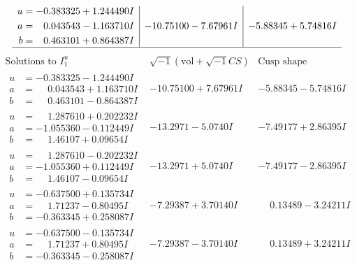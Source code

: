 \documentclass[1p]{elsarticle_modified}
\theoremstyle{definition}
\newcommand{\I}{\sqrt{-1}}
\begin{document}
$$\begin{array}{c|c|c}
\begin{aligned}
u &= -0.383325 + 1.244490 I \\
a &= \phantom{-}0.043543 - 1.163710 I \\
b &= \phantom{-}0.463101 + 0.864387 I\end{aligned}
 & -10.75100 - 7.67961 I & -5.88345 + 5.74816 I\\
 \hline 
 \end{array}$$\newpage$$\begin{array}{c|c|c}  
\text{Solutions to }I^u_{1}& \I (\text{vol} + \sqrt{-1}CS) & \text{Cusp shape}\\
 \hline 
\begin{aligned}
u &= -0.383325 - 1.244490 I \\
a &= \phantom{-}0.043543 + 1.163710 I \\
b &= \phantom{-}0.463101 - 0.864387 I\end{aligned}
 & -10.75100 + 7.67961 I & -5.88345 - 5.74816 I \\ \hline\begin{aligned}
u &= \phantom{-}1.287610 + 0.202232 I \\
a &= -1.055360 - 0.112449 I \\
b &= \phantom{-}1.46107 + 0.09654 I\end{aligned}
 & -13.2971 - 5.0740 I & -7.49177 + 2.86395 I \\ \hline\begin{aligned}
u &= \phantom{-}1.287610 - 0.202232 I \\
a &= -1.055360 + 0.112449 I \\
b &= \phantom{-}1.46107 - 0.09654 I\end{aligned}
 & -13.2971 + 5.0740 I & -7.49177 - 2.86395 I \\ \hline\begin{aligned}
u &= -0.637500 + 0.135734 I \\
a &= \phantom{-}1.71237 - 0.80495 I \\
b &= -0.363345 + 0.258087 I\end{aligned}
 & -7.29387 + 3.70140 I & \phantom{-}0.13489 - 3.24211 I \\ \hline\begin{aligned}
u &= -0.637500 - 0.135734 I \\
a &= \phantom{-}1.71237 + 0.80495 I \\
b &= -0.363345 - 0.258087 I\end{aligned}
 & -7.29387 - 3.70140 I & \phantom{-}0.13489 + 3.24211 I \\ \hline\begin{aligned}

\end{aligned}
\end{array}$$
\end{document}
